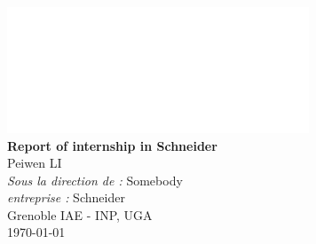 \documentclass[12pt,oneside,english]{book}
\begin{document}
	\pagestyle{plain}


	\frontmatter

	\begin{titlepage}



		\begin{center}
			\includegraphics[width=9cm]{images/iae.png}\\[0.5cm]
			\linespread{1.2}\huge {\bfseries Report of internship in Schneider}\\[1cm]
			\linespread{0.5}
			{\Large Peiwen LI}\\[0.1cm]
			{\large \emph{Sous la direction de :} Somebody}\\[0.1cm] %
			{\large  \emph{entreprise :} Schneider}\\[1cm]
			{\large
			Grenoble IAE - INP, UGA\\
			\today}
		\end{center}
	\end{titlepage}



	\newpage

	


\end{document}
